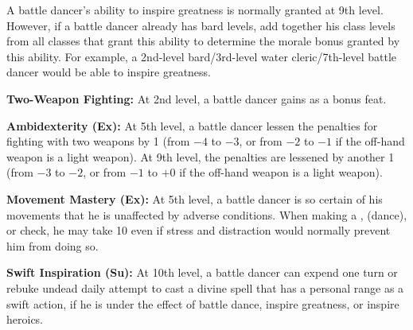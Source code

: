{A battle dancer's ability to inspire greatness is normally granted at 9th level. However, if a battle dancer already has bard levels, add together his class levels from all classes that grant this ability to determine the morale bonus granted by this ability. For example, a 2nd-level bard/3rd-level water cleric/7th-level battle dancer would be able to inspire greatness.

\textbf{Two-Weapon Fighting:} At 2nd level, a battle dancer gains  as a bonus feat.

\textbf{Ambidexterity (Ex):} At 5th level, a battle dancer lessen the penalties for fighting with two weapons by 1 (from $-4$ to $-3$, or from $-2$ to $-1$ if the off-hand weapon is a light weapon). At 9th level, the penalties are lessened by another 1 (from $-3$ to $-2$, or from $-1$ to $+0$ if the off-hand weapon is a light weapon).

\textbf{Movement Mastery (Ex):} At 5th level, a battle dancer is so certain of his movements that he is unaffected by adverse conditions. When making a ,  (dance), or  check, he may take 10 even if stress and distraction would normally prevent him from doing so.

\textbf{Swift Inspiration (Su):} At 10th level, a battle dancer can expend one turn or rebuke undead daily attempt to cast a divine spell that has a personal range as a swift action, if he is under the effect of battle dance, inspire greatness, or inspire heroics.
}
